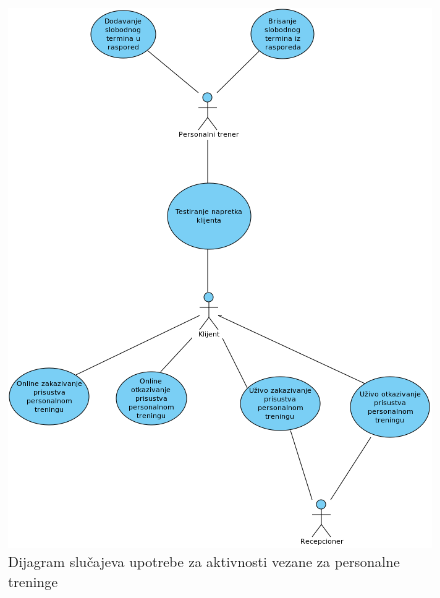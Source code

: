 \begin{figure}[!ht]
\begin{center}
\includegraphics[scale=0.55]{sections/images/personalni_treninzi_slucajevi_upotrebe.png}
\end{center}
\caption{Dijagram slučajeva upotrebe za aktivnosti vezane za personalne treninge}
\label{fig:kontekst}
\end{figure}

\newpage

